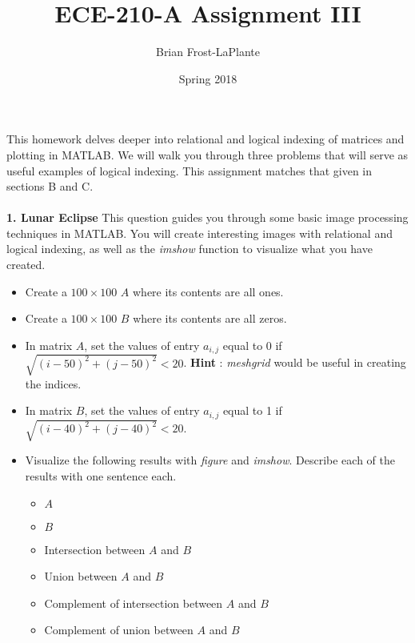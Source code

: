 \documentclass{article}
\title{ECE-210-A Assignment III}
\author{Brian Frost-LaPlante}
\date{Spring 2018}
\begin{document}
\maketitle
\noindent This homework delves deeper into relational and logical indexing of matrices and plotting in MATLAB. We will walk you through three problems that will serve as useful examples of logical indexing. This assignment matches that given in sections B and C.
\\\\
\noindent \textbf{1. Lunar Eclipse} This question guides you through some basic image processing techniques in MATLAB. You will create interesting images with relational and logical indexing, as well as the \emph{imshow} function to visualize what you have created.  
\begin{itemize}
\item Create a $100 \times 100$ $A$ where its contents are all ones.
\item Create a $100 \times 100$ $B$ where its contents are all zeros.
\item In matrix $A$, set the values of entry $a_{i,j}$ equal to 0 if $\sqrt{(i-50)^2 + (j-50)^2} < 20$. \textbf{Hint} : \emph{meshgrid} would be useful in creating the indices.
\item In matrix $B$, set the values of entry $a_{i,j}$ equal to 1 if $\sqrt{(i-40)^2 + (j-40)^2} < 20$.
\item Visualize the following results with \emph{figure} and \emph{imshow}. Describe each of the results with one sentence each. 
\begin{itemize}
\item $A$
\item $B$
\item Intersection between $A$ and $B$
\item Union between $A$ and $B$
\item Complement of intersection between $A$ and $B$
\item Complement of union between $A$ and $B$
\end{itemize}
\end{itemize}
\end{document}
